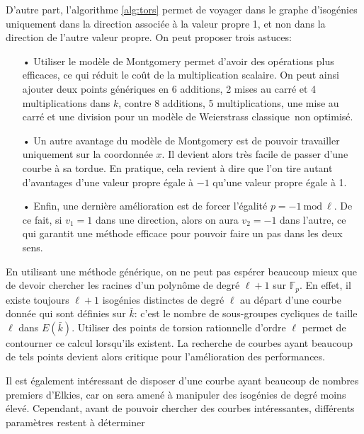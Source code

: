 \documentclass[11pt,a4paper]{article}
\newcommand{\F}{\mathbb{F}}
\renewcommand{\mod}{\ \mathrm{mod}\ }
\renewcommand{\v}{\vspace{5mm}}
\theoremstyle{definition}
\begin{document}
\v
D'autre part, l'algorithme \ref{alg:tors} permet de voyager dans le graphe d'isogénies uniquement dans la direction associée à la valeur propre 1, et non dans la direction de l'autre valeur propre. On peut proposer trois astuces:
\begin{itemize}
\item[•] Utiliser le modèle de Montgomery permet d'avoir des opérations plus efficaces, ce qui réduit le coût de la multiplication scalaire. On peut ainsi ajouter deux points génériques en 6 additions, 2 mises au carré et 4 multiplications dans $k$, contre 8 additions, 5 multiplications, une mise au carré et une division pour un modèle de Weierstrass \og classique\fg\ non optimisé.

\item[•] Un autre avantage du modèle de Montgomery est de pouvoir travailler uniquement sur la coordonnée $x$. Il devient alors très facile de passer d'une courbe à sa tordue. En pratique, cela revient à dire que l'on tire autant d'avantages d'une valeur propre égale à $-1$ qu'une valeur propre égale à 1.

\item[•] Enfin, une dernière amélioration est de forcer l'égalité $p = -1 \mod\ell$. De ce fait, si $v_1 = 1$ dans une direction, alors on aura $v_2 = -1$ dans l'autre, ce qui garantit une méthode efficace pour pouvoir faire un pas dans les deux sens.
\end{itemize}
\v

En utilisant une méthode générique, on ne peut pas espérer beaucoup mieux que de devoir chercher les racines d'un polynôme de degré $\ell + 1$ sur $\F_p$. En effet, il existe toujours $\ell + 1$ isogénies distinctes de degré $\ell$ au départ d'une courbe donnée qui sont définies sur $\bar{k}$: c'est le nombre de sous-groupes cycliques de taille $\ell$ dans $E(\bar{k})$. Utiliser des points de torsion rationnelle d'ordre $\ell$ permet de contourner ce calcul lorsqu'ils existent. La recherche de courbes ayant beaucoup de tels points devient alors critique pour l'amélioration des performances.

Il est également intéressant de disposer d'une courbe ayant beaucoup de nombres premiers d'Elkies, car on sera amené à manipuler des isogénies de degré moins élevé. Cependant, avant de pouvoir chercher des courbes intéressantes, différents paramètres restent à déterminer
\end{document}
